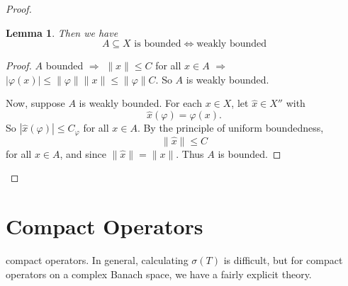 \documentclass[justified]{tufte-book}
\theoremstyle{plain}%
\newtheorem{lem}[thm]{Lemma}
\theoremstyle{definition}
\theoremstyle{remark}
\renewcommand{\phi}{\varphi}
\begin{document}
\begin{proof}
\begin{lem}
  Then we have \[
      \text{$A \subseteq X$ is bounded}  \iff \text{weakly bounded}
  \]
\end{lem}
\begin{proof}
  $A$ bounded $\Rightarrow$ $\| x \| \leq C$ for all $x \in A$ $\Rightarrow$ $|\phi(x)| \leq \| \phi \| \| x \| \leq \|\phi \| C$.  So $A$ is weakly bounded.
  
  Now, suppose $A$ is weakly bounded.  For each $x \in X$, let $\hat x \in X''$ with \[
      \hat x(\phi) = \phi(x).
  \]  So $| \hat x(\phi) | \leq C_\phi$ for all $x \in A$.  By the principle of uniform boundedness, \[
      \| \hat x \| \leq C
  \] for all $x \in A$, and since $\| \hat x \| = \| x \|$.  Thus $A$ is bounded.  
\end{proof}
\end{proof}  


\chapter{Compact Operators}
 compact operators.  In general, calculating $\sigma(T)$ is difficult, but for compact operators on a complex Banach space, we have a fairly explicit theory.
\end{document}

